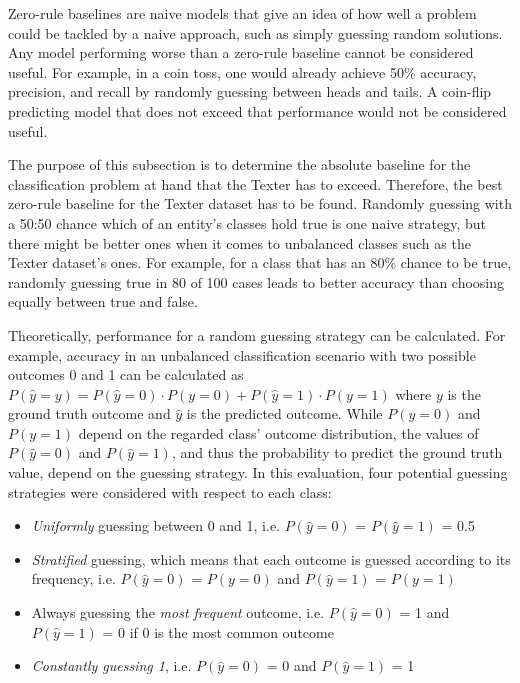 Zero-rule baselines are naive models that give an idea of how well a problem could be tackled by a naive approach, such as simply guessing random solutions. Any model performing worse than a zero-rule baseline cannot be considered useful. For example, in a coin toss, one would already achieve 50\% accuracy, precision, and recall by randomly guessing between heads and tails. A coin-flip predicting model that does not exceed that performance would not be considered useful.

The purpose of this subsection is to determine the absolute baseline for the classification problem at hand that the Texter has to exceed. Therefore, the best zero-rule baseline for the Texter dataset has to be found. Randomly guessing with a 50:50 chance which of an entity's classes hold true is one naive strategy, but there might be better ones when it comes to unbalanced classes such as the Texter dataset's ones. For example, for a class that has an 80\% chance to be true, randomly guessing true in 80 of 100 cases leads to better accuracy than choosing equally between true and false.

Theoretically, performance for a random guessing strategy can be calculated. For example, accuracy in an unbalanced classification scenario with two possible outcomes 0 and 1 can be calculated as $P(\hat{y} = y) = P(\hat{y} = 0) \cdot P(y = 0) + P(\hat{y} = 1) \cdot P(y = 1)$ where $y$ is the ground truth outcome and $\hat{y}$ is the predicted outcome. While $P(y = 0)$ and $P(y = 1)$ depend on the regarded class' outcome distribution, the values of $P(\hat{y} = 0)$ and $P(\hat{y} = 1)$, and thus the probability to predict the ground truth value, depend on the guessing strategy. In this evaluation, four potential guessing strategies were considered with respect to each class:

\begin{itemize}
    \item \emph{Uniformly} guessing between 0 and 1, i.e. $P(\hat{y} = 0)$ = $P(\hat{y} = 1)$ = 0.5

    \item \emph{Stratified} guessing, which means that each outcome is guessed according to its frequency, i.e. $P(\hat{y} = 0)$ = $P(y = 0)$ and $P(\hat{y} = 1)$ = $P(y = 1)$

    \item Always guessing the \emph{most frequent} outcome, i.e.  $P(\hat{y} = 0)$ = 1 and $P(\hat{y} = 1)$ = 0 if 0 is the most common outcome

    \item \emph{Constantly guessing 1}, i.e. $P(\hat{y} = 0)$ = 0 and $P(\hat{y} = 1)$ = 1
\end{itemize}

